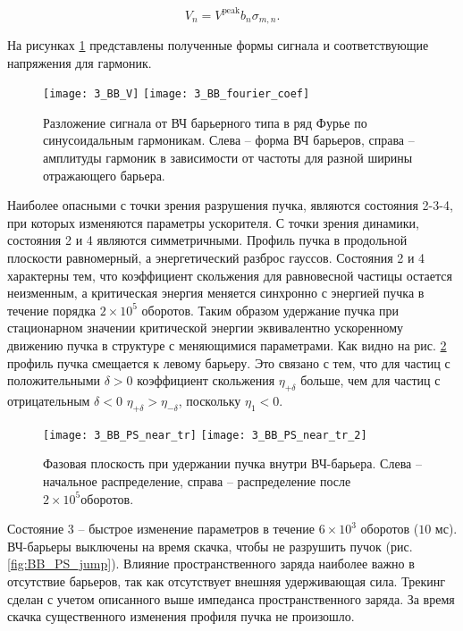 \begin{equation}
V_n=V^{\textrm{peak}}b_n\sigma_{m, n}.
\label{Volt_n}
\end{equation}

\noindent На рисунках \ref{fig:wave} представлены полученные формы сигнала и со\-от\-вет\-ству\-ющ\-ие напряжения для гармоник.

\begin{figure}[!h]
   \texttt{[image: 3\_BB\_V]}
   \texttt{[image: 3\_BB\_fourier\_coef]}
   \caption{Разложение сигнала от ВЧ барьерного типа в ряд Фурье по синусоидальным гармоникам. Слева – форма 
   ВЧ барьеров, справа – амплитуды гармоник в зависимости от частоты для разной ширины отражающего барьера.}
   \label{fig:wave}
\end{figure}

\par Наиболее опасными с точки зрения разрушения пучка, являются со\-сто\-я\-ния 2-3-4, при которых изменяются параметры ускорителя. С точки зрения динамики, состояния 2 и 4 являются симметричными. Профиль пучка в продольной плоскости равномерный, а э\-нер\-ге\-ти\-чес\-кий разброс гауссов. Состояния 2 и 4 характерны тем, что коэффициент скольжения для равновесной частицы остается неизменным, а кри\-ти\-чес\-кая энергия меняется синхронно с энергией пучка в течение порядка $2\times{10}^5$ оборотов. Таким образом удержание пучка при стационарном значении критической энергии эквивалентно ускоренному движению пуч\-ка в структуре с меняющимися параметрами. Как видно на рис. \ref{fig:BB_PS_near_tr} профиль пучка смещается к левому барьеру. Это связано с тем, что для частиц с положительными $\delta>0$ коэффициент скольжения $\eta_{+\delta}$ больше, чем для частиц с отрицательным $\delta<0$ $\eta_{+\delta}>\eta_{-\delta}$, поскольку $\eta_1<0$. 

\begin{figure}
   \texttt{[image: 3\_BB\_PS\_near\_tr]}
   \texttt{[image: 3\_BB\_PS\_near\_tr\_2]}
   \caption{Фазовая плоскость при удержании пучка внутри ВЧ-барьера. Слева – начальное распределение, справа – распределение после $2\times{10}^5 оборотов$.}
   \label{fig:BB_PS_near_tr}
\end{figure}

\par Состояние 3 – быстрое изменение параметров в течение $6\times{10}^3$ о\-бо\-ро\-тов ($10$ мс). ВЧ-барьеры выключены на время скачка, чтобы не разрушить пучок (рис. \ref{fig:BB_PS_jump}).  Влияние пространственного заряда наиболее важно в отсутствие барь\-е\-ров, так как отсутствует внешняя удерживающая сила. Трекинг сделан с учетом описанного выше импеданса пространственного заряда. За время скачка существенного изменения профиля пучка не про\-и\-зош\-ло.

